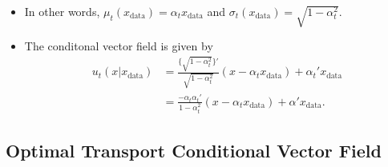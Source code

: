 \documentclass[10pt]{article}
\newcommand{\data}{\mathrm{data}}
\begin{document}
\begin{itemize}
\begin{itemize}
    \item In other words, $\mu_t(x_{\data}) = \alpha_t x_{\data}$ and $\sigma_t(x_{\data}) = \sqrt{1-\alpha_t^2}$.
    
    \item The conditonal vector field is given by
    \begin{align*}
      u_t(x|x_{\data}) 
      &= \frac{\{ \sqrt{1 - \alpha_t^2} \}' }{\sqrt{1-\alpha_t^2}} (x - \alpha_t x_{\data}) + \alpha_t' x_{\data} \\
      &= \frac{-\alpha_t \alpha_t'}{1 - \alpha_t^2}(x - \alpha_t x_{\data}) + \alpha' x_{\data}.
    \end{align*}
  \end{itemize}
\end{itemize}

\subsection{Optimal Transport Conditional Vector Field}
\end{document}
